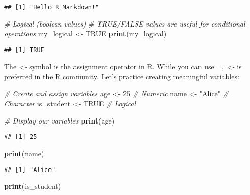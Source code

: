 \documentclass[
]{book}
\newenvironment{Shaded}{\begin{snugshade}}{\end{snugshade}}
\newcommand{\CommentTok}[1]{\textcolor[rgb]{0.56,0.35,0.01}{\textit{#1}}}
\newcommand{\ConstantTok}[1]{\textcolor[rgb]{0.56,0.35,0.01}{#1}}
\newcommand{\DecValTok}[1]{\textcolor[rgb]{0.00,0.00,0.81}{#1}}
\newcommand{\FunctionTok}[1]{\textcolor[rgb]{0.13,0.29,0.53}{\textbf{#1}}}
\newcommand{\NormalTok}[1]{#1}
\newcommand{\OtherTok}[1]{\textcolor[rgb]{0.56,0.35,0.01}{#1}}
\newcommand{\StringTok}[1]{\textcolor[rgb]{0.31,0.60,0.02}{#1}}
\begin{document}
\begin{verbatim}
## [1] "Hello R Markdown!"
\end{verbatim}

\begin{Shaded}
\begin{Highlighting}[]
\CommentTok{\# Logical (boolean values)}
\CommentTok{\# TRUE/FALSE values are useful for conditional operations}
\NormalTok{my\_logical }\OtherTok{\textless{}{-}} \ConstantTok{TRUE}
\FunctionTok{print}\NormalTok{(my\_logical)}
\end{Highlighting}
\end{Shaded}

\begin{verbatim}
## [1] TRUE
\end{verbatim}

The \emph{\textless-} symbol is the assignment operator in R. While you can use \emph{=}, \emph{\textless-} is preferred in the R community. Let's practice creating meaningful variables:

\begin{Shaded}
\begin{Highlighting}[]
\CommentTok{\# Create and assign variables}
\NormalTok{age }\OtherTok{\textless{}{-}} \DecValTok{25}        \CommentTok{\# Numeric}
\NormalTok{name }\OtherTok{\textless{}{-}} \StringTok{"Alice"}  \CommentTok{\# Character}
\NormalTok{is\_student }\OtherTok{\textless{}{-}} \ConstantTok{TRUE}  \CommentTok{\# Logical}

\CommentTok{\# Display our variables}
\FunctionTok{print}\NormalTok{(age)}
\end{Highlighting}
\end{Shaded}

\begin{verbatim}
## [1] 25
\end{verbatim}

\begin{Shaded}
\begin{Highlighting}[]
\FunctionTok{print}\NormalTok{(name)}
\end{Highlighting}
\end{Shaded}

\begin{verbatim}
## [1] "Alice"
\end{verbatim}

\begin{Shaded}
\begin{Highlighting}[]
\FunctionTok{print}\NormalTok{(is\_student)}
\end{Highlighting}
\end{Shaded}
\end{document}
